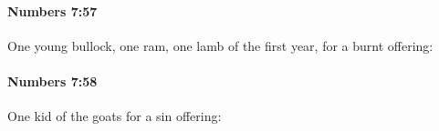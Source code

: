 		\paragraph{Numbers 7:57} %
			\label{NUMBERS-7-57}

			One young bullock, one ram, one lamb of the first year, for a burnt offering:


		\paragraph{Numbers 7:58} %
			\label{NUMBERS-7-58}

			One kid of the goats for a sin offering:


